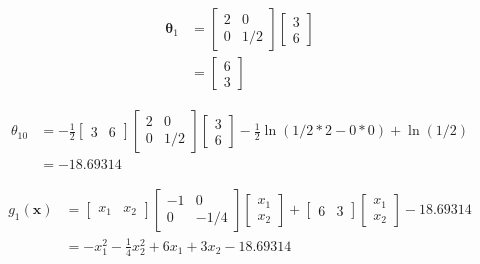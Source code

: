\documentclass{homeworg}
\begin{document}
\begin{equation}
    \begin{aligned}
        \bm{\theta}_1 &=
        \begin{bmatrix}
            2 & 0 \\
            0 & 1/2
        \end{bmatrix}
        \begin{bmatrix}
            3 \\ 6
        \end{bmatrix}
        \\ &=
        \begin{bmatrix}
            6 \\
            3
        \end{bmatrix}
    \end{aligned}
\end{equation}

\begin{equation}
    \begin{aligned}
        {\theta}_{10} &=
        -\frac{1}{2}
        \begin{bmatrix}
            3 & 6
        \end{bmatrix}
        \begin{bmatrix}
            2 & 0 \\ 0 & 1/2
        \end{bmatrix}
        \begin{bmatrix}
            3 \\ 6
        \end{bmatrix}
        -\frac{1}{2}\ln(1/2*2-0*0)+\ln(1/2)
        \\ &= - 18.69314
    \end{aligned}
\end{equation}

\begin{equation}
    \begin{aligned}
        g_1(\bm{x}) &=
        \begin{bmatrix}
            x_1 & x_2
        \end{bmatrix}
        \begin{bmatrix}
            -1 & 0 \\
            0 & -1/4
        \end{bmatrix}
        \begin{bmatrix}
            x_1 \\ x_2
        \end{bmatrix} + 
        \begin{bmatrix}
            6 & 3
        \end{bmatrix}
        \begin{bmatrix}
            x_1 \\ x_2
        \end{bmatrix} - 18.69314
        \\ &=
        -x_1^2-\frac{1}{4}x_2^2+6x_1+3x_2 - 18.69314
    \end{aligned}
\end{equation}
\end{document}
